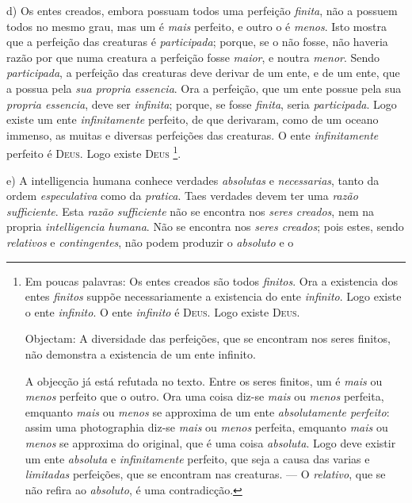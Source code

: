  d) Os entes creados, embora possuam todos uma perfeição \emph{finita}, não a possuem todos no mesmo grau, mas um é \emph{mais} perfeito, e outro o é \emph{menos}. Isto mostra que a perfeição das creaturas é \emph{participada}; porque, se o não fosse, não haveria razão por que numa creatura a perfeição fosse \emph{maior}, e noutra \emph{menor}. Sendo \emph{participada}, a perfeição das creaturas deve derivar de um ente, e de um ente, que a possua pela \emph{sua propria essencia}. Ora a perfeição, que um ente possue pela sua \emph{propria essencia}, deve ser \emph{infinita}; porque, se fosse \emph{finita}, seria \emph{participada}. Logo existe um ente \emph{infinitamente} perfeito, de que derivaram, como de um oceano immenso, as muitas e diversas perfeições das creaturas. O ente \emph{infinitamente} perfeito é \textsc{Deus}. Logo existe \textsc{Deus} \footnote{Em poucas palavras: Os entes creados são todos \emph{finitos}. Ora a existencia dos entes \emph{finitos} suppõe necessariamente a existencia do ente \emph{infinito}. Logo existe o ente \emph{infinito}. O ente \emph{infinito} é \textsc{Deus}. Logo existe \textsc{Deus}.\par Objectam: A diversidade das perfeições, que se encontram nos seres finitos, não demonstra a existencia de um ente infinito.\par A objecção já está refutada no texto. Entre os seres finitos, um é \emph{mais} ou \emph{menos} perfeito que o outro. Ora uma coisa diz-se \emph{mais} ou \emph{menos} perfeita, emquanto \emph{mais} ou \emph{menos} se approxima de um ente \emph{absolutamente perfeito}: assim uma photographia diz-se \emph{mais} ou \emph{menos} perfeita, emquanto \emph{mais} ou \emph{menos} se approxima do original, que é uma coisa \emph{absoluta}. Logo deve existir um ente \emph{absoluta} e \emph{infinitamente} perfeito, que seja a causa das varias e \emph{limitadas} perfeições, que se encontram nas creaturas. --- O \emph{relativo}, que se não refira ao \emph{absoluto}, é uma contradicção.}.

e) A intelligencia humana conhece verdades \emph{absolutas} e \emph{necessarias}, tanto da ordem \emph{especulativa} como da \emph{pratica}. Taes verdades devem ter uma \emph{razão sufficiente}. Esta \emph{razão sufficiente} não se encontra nos \emph{seres creados}, nem na propria \emph{intelligencia humana}. Não se encontra nos \emph{seres creados}; pois estes, sendo \emph{relativos} e \emph{contingentes}, não podem produzir o \emph{absoluto} e o
